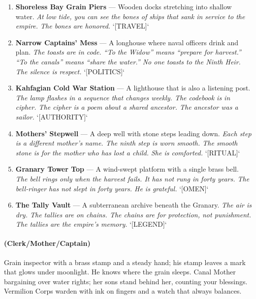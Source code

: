 \begin{enumerate}
\item \textbf{Shoreless Bay Grain Piers} --- Wooden docks stretching into shallow water.
  \hfill \textit{At low tide, you can see the bones of ships that sank in service to the empire. The bones are honored.} `[TRAVEL]`
\item \textbf{Narrow Captains' Mess} --- A longhouse where naval officers drink and plan.
  \hfill \textit{The toasts are in code. ``To the Widow'' means ``prepare for harvest.'' ``To the canals'' means ``share the water.'' No one toasts to the Ninth Heir. The silence is respect.} `[POLITICS]`
\item[J] \textbf{Kahfagian Cold War Station} --- A lighthouse that is also a listening post.
  \hfill \textit{The lamp flashes in a sequence that changes weekly. The codebook is in cipher. The cipher is a poem about a shared ancestor. The ancestor was a sailor.} `[AUTHORITY]`
\item[Q] \textbf{Mothers' Stepwell} --- A deep well with stone steps leading down.
  \hfill \textit{Each step is a different mother's name. The ninth step is worn smooth. The smooth stone is for the mother who has lost a child. She is comforted.} `[RITUAL]`
\item[K] \textbf{Granary Tower Top} --- A wind-swept platform with a single brass bell.
  \hfill \textit{The bell rings only when the harvest fails. It has not rung in forty years. The bell-ringer has not slept in forty years. He is grateful.} `[OMEN]`
\item[A] \textbf{The Tally Vault} --- A subterranean archive beneath the Granary.
  \hfill \textit{The air is dry. The tallies are on chains. The chains are for protection, not punishment. The tallies are the empire's memory.} `[LEGEND]`
\end{enumerate}

\paragraph*{(Clerk/Mother/Captain)} Grain inspector with a brass stamp and a steady hand; his stamp leaves a mark that glows under moonlight. He knows where the grain sleeps. Canal Mother bargaining over water rights; her sons stand behind her, counting your blessings. Vermilion Corps warden with ink on fingers and a watch that always balances.

